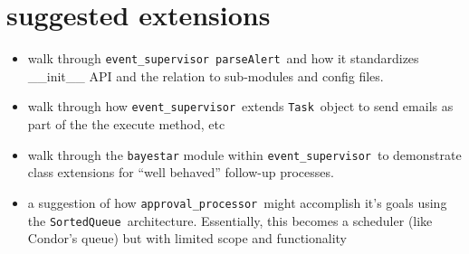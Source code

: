 \documentclass{article}
\newcommand{\parseAlert}{\texttt{parseAlert}~}
\newcommand{\SortedQueue}{\texttt{SortedQueue}~}
\newcommand{\Task}{\texttt{Task}~}
\newcommand{\approvalProcessor}{\texttt{approval\_processor}~}
\newcommand{\eventSupervisor}{\texttt{event\_supervisor}~}
\begin{document}
\section{suggested extensions}
\label{sec: suggested extensions}

\begin{itemize}
    \item{walk through \eventSupervisor \parseAlert and how it standardizes \_\_init\_\_ API and the relation to sub-modules and config files.}
    \item{walk through how \eventSupervisor extends \Task object to send emails as part of the the execute method, etc}
    \item{walk through the \texttt{bayestar} module within \eventSupervisor to demonstrate class extensions for ``well behaved'' follow-up processes.}
    \item{a suggestion of how \approvalProcessor might accomplish it's goals using the \SortedQueue architecture. Essentially, this becomes a scheduler (like Condor's queue) but with limited scope and functionality}
\end{itemize}

\end{document}
